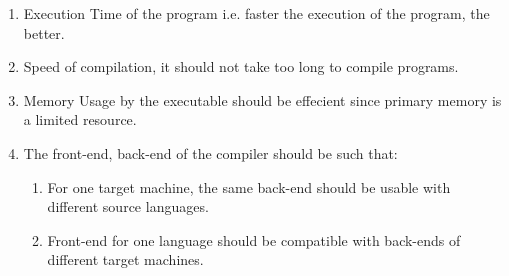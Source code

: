 \documentclass[12pt]{article}
\begin{document}
\begin{enumerate}
\begin{enumerate}
\item Execution Time of the program i.e. faster the execution of the program, the better.
\item Speed of compilation, it should not take too long to compile programs.
\item Memory Usage by the executable should be effecient since primary memory is a limited resource.
\item The front-end, back-end of the compiler should be such that:
\begin{enumerate}
\item For one target machine, the same back-end should be usable with different source languages.
\item Front-end for one language should be compatible with back-ends of different target machines.
\end{enumerate}
\end{enumerate}
\end{enumerate}
\end{document}
